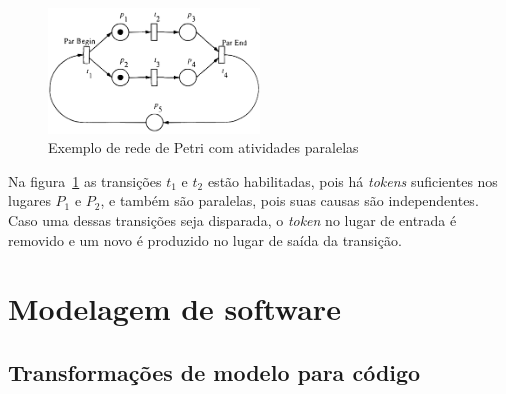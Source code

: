 \begin{figure}[h]
	\caption{\label{fig:petrinet}Exemplo de rede de Petri com atividades paralelas}
	\begin{center}
	    \includegraphics[width=0.5\textwidth]{resources/petri_net_murata_1}
	\end{center}
\end{figure}

Na figura~\ref{fig:petrinet} as transições $t_1$ e $t_2$ estão habilitadas, pois há \textit{tokens} suficientes nos lugares $P_1$ e $P_2$, e também são paralelas, pois suas causas são independentes. Caso uma dessas transições seja disparada, o \textit{token} no lugar de entrada é removido e um novo é produzido no lugar de saída da transição.

\section{Modelagem de software}
\label{sec:modelagem}
\subsection{Transformações de modelo para código}